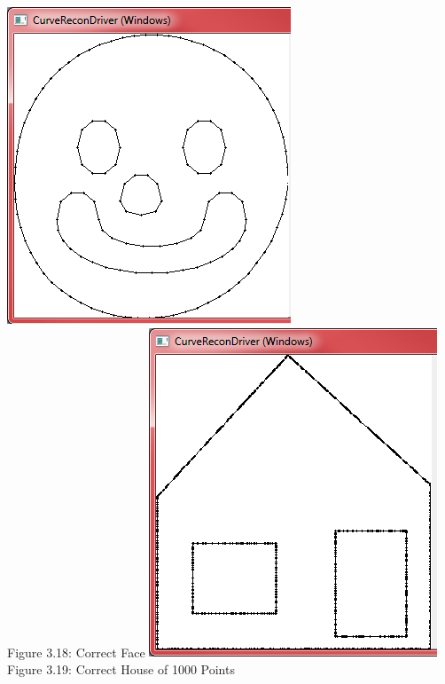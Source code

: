    \begin{center}
        \includegraphics[scale = 0.5]{4UpToFiveSort/utfsFace.png}\\
        \label{fig:utfs_correctface}
        Figure 3.18: Correct Face
        \includegraphics[scale = 0.5]{4UpToFiveSort/utfsHouse1000.png}
        \label{fig:utfs_correcthouse}\\
        Figure 3.19: Correct House of 1000 Points
    \end{center}

